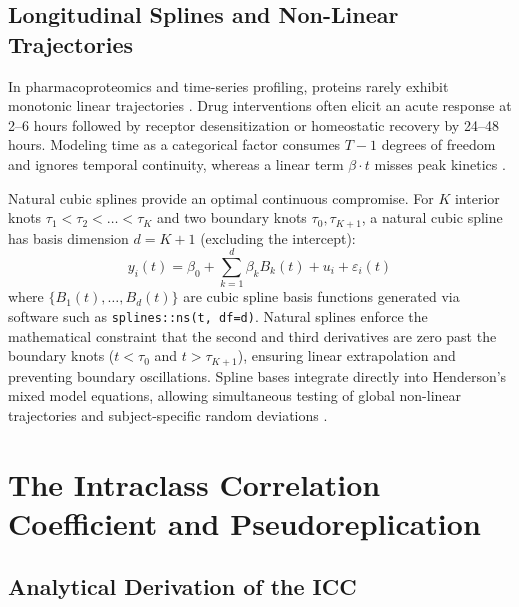 \documentclass[11pt,twoside,openright]{book}
\begin{document}
\subsection{Longitudinal Splines and Non-Linear Trajectories}

In pharmacoproteomics and time-series profiling, proteins rarely exhibit monotonic linear trajectories \cite{wood2017generalized}. Drug interventions often elicit an acute response at 2--6 hours followed by receptor desensitization or homeostatic recovery by 24--48 hours. Modeling time as a categorical factor consumes $T - 1$ degrees of freedom and ignores temporal continuity, whereas a linear term $\beta \cdot t$ misses peak kinetics \cite{hastie1990generalized}.

Natural cubic splines provide an optimal continuous compromise. For $K$ interior knots $\tau_1 < \tau_2 < \dots < \tau_K$ and two boundary knots $\tau_0, \tau_{K+1}$, a natural cubic spline has basis dimension $d = K + 1$ (excluding the intercept):
\begin{equation}
\label{eq:spline_model}
y_i(t) = \beta_0 + \sum_{k=1}^d \beta_k B_k(t) + u_i + \varepsilon_i(t)
\end{equation}
where $\{B_1(t), \dots, B_d(t)\}$ are cubic spline basis functions generated via software such as \texttt{splines::ns(t, df=d)}. Natural splines enforce the mathematical constraint that the second and third derivatives are zero past the boundary knots ($t < \tau_0$ and $t > \tau_{K+1}$), ensuring linear extrapolation and preventing boundary oscillations. Spline bases integrate directly into Henderson's mixed model equations, allowing simultaneous testing of global non-linear trajectories and subject-specific random deviations \cite{hoffman2021dream}.

\section{The Intraclass Correlation Coefficient and Pseudoreplication}

\subsection{Analytical Derivation of the ICC}
\end{document}
